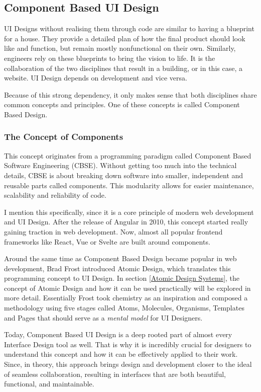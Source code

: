 \newpage
\subsection{Component Based UI Design}
UI Designs without realising them through code are similar to having a blueprint for a house. They
provide a detailed plan of how the final product should look like and function, but remain mostly
nonfunctional on their own. Similarly, engineers rely on these blueprints to bring the vision to
life. It is the collaboration of the two disciplines that result in a building, or in this case, a
website. UI Design depends on development and vice versa. 

Because of this strong dependency, it only makes sense that both disciplines share common concepts
and principles. One of these concepts is called Component Based Design.

\subsubsection{The Concept of Components}
This concept originates from a programming paradigm called Component Based Software Engineering
(CBSE). Without getting too much into the technical details, CBSE is about breaking down software
into smaller, independent and reusable parts called components. This modularity allows for easier
maintenance, scalability and reliability of code.

I mention this specifically, since it is a core principle of modern web development and UI Design.
After the release of Angular in 2010, this concept started really gaining traction in web
development. 
Now, almost all popular frontend frameworks like React, Vue or Svelte are built around components.
  

Around the same time as Component Based Design became popular in web development, Brad Frost
introduced Atomic Design, which translates this programming concept to UI Design. In section
\ref{Atomic Design Systems}, the concept of Atomic Design and how it can be used practically will be
explored in more detail. Essentially Frost took chemistry as an inspiration and composed a methodology
using five stages called Atoms, Molecules, Organisms, Templates and Pages that should serve as a
\textit{mental model} for UI Designers. 

Today, Component Based UI Design is a deep rooted part of almost every Interface Design tool as
well. That is why it is incredibly crucial for designers to understand this concept and how it can
be effectively applied to their work. Since, in theory, this approach brings design and development
closer to the ideal of seamless collaboration, resulting in interfaces that are both beautiful,
functional, and maintainable.